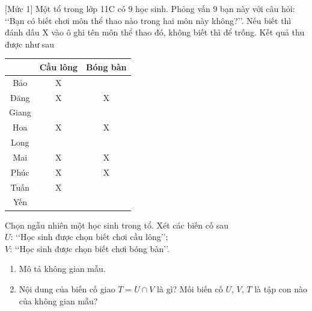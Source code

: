 \begin{bt}%
[Mức 1]
	Một tổ trong lớp 11C có $9$ học sinh. Phỏng vấn $9$ bạn này với câu hỏi: \lq\lq Bạn có biết chơi môn thể thao nào trong hai môn này không?\rq\rq. Nếu biết thì đánh dấu X vào ô ghi tên môn thể thao đó, không biết thì để trống. Kết quả thu được như sau
	\begin{center}
		\begin{tabular}{|c|c|c|}
			\hline
			\diagbox{Tên học sinh}{Môn thể thao} & Cầu lông & Bóng bàn \\
			\hline
			Bảo & X & \\
			\hline
			Đăng & X & X \\
			\hline
			Giang & & \\
			\hline
			Hoa & X & X \\
			\hline
			Long & & \\
			\hline
			Mai & X & X \\
			\hline
			Phúc & X & X \\
			\hline
			Tuấn & X & \\
			\hline
			Yến & & \\
			\hline
		\end{tabular}
	\end{center}
	Chọn ngẫu nhiên một học sinh trong tổ. Xét các biến cố sau\\	
	$U$: \lq\lq Học sinh được chọn biết chơi cầu lông\rq\rq;\\
	$V$: \lq\lq Học sinh được chọn biết chơi bóng bàn\rq\rq.
	\begin{enumerate}
		\item Mô tả không gian mẫu.
		\item Nội dung của biến cố giao $T=U \cap V$ là gì? Mối biến cố $U$, $V$, $T$ là tập con nào của không gian mẫu?
	\end{enumerate}
\end{bt}

